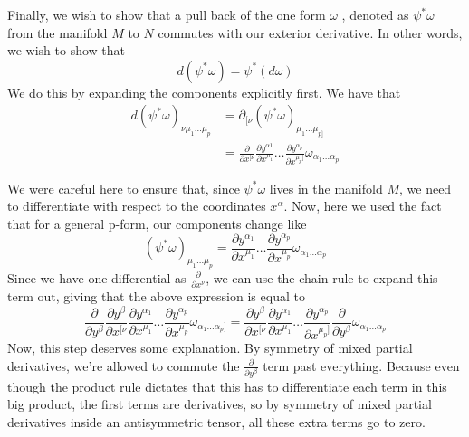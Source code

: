 \documentclass[11pt, a4paper]{article}   	%
\theoremstyle{slplain}
\begin{document}
Finally, we wish to show that a pull back of the 
one form $ \omega  $ , denoted as $\psi^* \omega $ from 
the manifold $ M $ to $ N $ commutes with our exterior derivative. 
In other words, we wish to show that 
\[
d ( \psi^* \omega  ) = \psi^ * ( d \omega)   
\] We do this by expanding the components explicitly  first. We have 
that 
\begin{align*}
d ( \psi ^* \omega  )_{ \nu \mu_1 \dots \mu_{ p } } &= \partial_{ [ \nu }( \psi^* \omega  )_{ \mu_1 \dots \mu_{ p ] }} \\
						    &= \frac{\partial  }{\partial x^{ [ \nu }} \frac{\partial y^{ \alpha 1 } }{\partial x^{ \mu_1 }} \dots \frac{\partial  y^{ \alpha_{ p }}}{\partial  x ^{ \mu_{ p } ] }} \omega _{ \alpha_1 \dots \alpha_{ p }}   
\end{align*}

We were careful here to ensure that, since $ \psi^* \omega  $ lives in 
the manifold $M $, we need to differentiate with respect to the coordinates 
$ x^{ \alpha }$. 
Now, here we used the fact that for a general p-form, our components 
change like
\[
( \psi^* \omega  )_{ \mu_1 \dots \mu_{p }} = \frac{\partial  y^{\alpha_1 } }{\partial x^{ \mu_1 }} \dots \frac{\partial y^{\alpha_{p } } }{\partial  x^{ \mu_{ p }}}  \omega _{ \alpha_1 \dots \alpha_{ p }} 
\] Since we have one differential as $ \frac{ \partial }{ \partial x^{ \nu  }}$,
we can use the chain rule to expand this term out, giving that 
the above expression is equal to 
\[
\frac{\partial  }{\partial  y ^{ \beta   }  } \frac{\partial  y^{ \beta  }  }{\partial x^{ [ \nu  }  }  \frac{\partial  y ^{ \alpha_1   }  }{\partial  x^{ \mu_1   }} \dots  \frac{\partial y^{ \alpha_{ p   } }}{\partial x^{ \mu_{ p } }  } \omega _{ \alpha_1 \dots \alpha_{ p } ]} = \frac{\partial y ^{ \beta   }}{\partial x^{ [ \nu  } } \frac{\partial  y^{ \alpha_1  }}{\partial x^{ \mu_1  } }  \dots \frac{\partial  y ^{ \alpha_{ p  }}}{\partial x^{ \mu_{ p   } ]  }} \frac{\partial }{\partial  y ^{ \beta   }  }  \omega _{ \alpha_1 \dots \alpha_{ p }}    
\] Now, this step deserves some 
explanation. By symmetry of mixed 
partial derivatives, 
we're allowed to commute the  $ \frac{\partial  }{\partial y^{ \beta  } } $ term past everything. Because even though the product rule dictates that this has to differentiate each term in this big product, the first terms are derivatives, so by symmetry of mixed partial derivatives inside an antisymmetric tensor, all these extra terms go to zero. 
\end{document}
